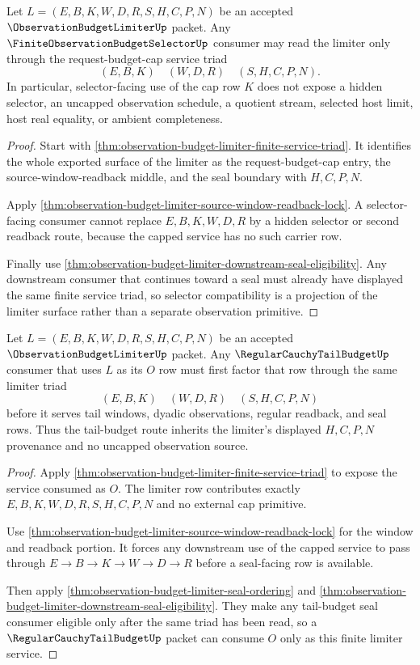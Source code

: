\begin{theorem}
\label{thm:observation-budget-limiter-selector-compatibility}
Let $L=(E,B,K,W,D,R,S,H,C,P,N)$ be an accepted $\ObservationBudgetLimiterUp$ packet. Any $\FiniteObservationBudgetSelectorUp$ consumer may read the limiter only through the request-budget-cap service triad
$$
(E,B,K) \quad (W,D,R) \quad (S,H,C,P,N).
$$
In particular, selector-facing use of the cap row $K$ does not expose a hidden selector, an uncapped observation schedule, a quotient stream, selected host limit, host real equality, or ambient completeness.
\end{theorem}
\begin{proof}
Start with \autoref{thm:observation-budget-limiter-finite-service-triad}. It identifies the whole exported surface of the limiter as the request-budget-cap entry, the source-window-readback middle, and the seal boundary with $H,C,P,N$.

Apply \autoref{thm:observation-budget-limiter-source-window-readback-lock}. A selector-facing consumer cannot replace $E,B,K,W,D,R$ by a hidden selector or second readback route, because the capped service has no such carrier row.

Finally use \autoref{thm:observation-budget-limiter-downstream-seal-eligibility}. Any downstream consumer that continues toward a seal must already have displayed the same finite service triad, so selector compatibility is a projection of the limiter surface rather than a separate observation primitive.
\end{proof}

\begin{theorem}
\label{thm:observation-budget-limiter-cauchy-tail-budget-factorization}
Let $L=(E,B,K,W,D,R,S,H,C,P,N)$ be an accepted $\ObservationBudgetLimiterUp$ packet. Any $\RegularCauchyTailBudgetUp$ consumer that uses $L$ as its $O$ row must first factor that row through the same limiter triad
$$
(E,B,K) \quad (W,D,R) \quad (S,H,C,P,N)
$$
before it serves tail windows, dyadic observations, regular readback, and seal rows. Thus the tail-budget route inherits the limiter's displayed $H,C,P,N$ provenance and no uncapped observation source.
\end{theorem}
\begin{proof}
Apply \autoref{thm:observation-budget-limiter-finite-service-triad} to expose the service consumed as $O$. The limiter row contributes exactly $E,B,K,W,D,R,S,H,C,P,N$ and no external cap primitive.

Use \autoref{thm:observation-budget-limiter-source-window-readback-lock} for the window and readback portion. It forces any downstream use of the capped service to pass through $E \to B \to K \to W \to D \to R$ before a seal-facing row is available.

Then apply \autoref{thm:observation-budget-limiter-seal-ordering} and \autoref{thm:observation-budget-limiter-downstream-seal-eligibility}. They make any tail-budget seal consumer eligible only after the same triad has been read, so a $\RegularCauchyTailBudgetUp$ packet can consume $O$ only as this finite limiter service.
\end{proof}

